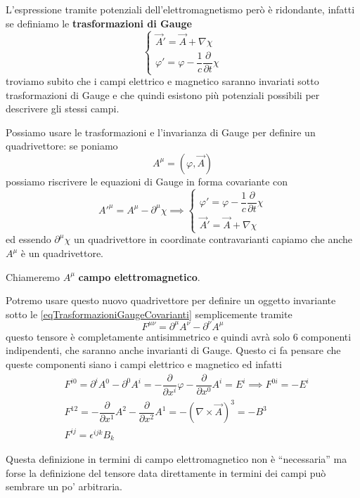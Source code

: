 \documentclass[12pt,a4paper,titlepage, twoside, openright]{book}
\numberwithin{equation}{chapter}
\begin{document}
L'espressione tramite potenziali dell'elettromagnetismo però è ridondante, infatti se definiamo le \textbf{trasformazioni di Gauge}
\begin{equation}
\begin{cases}
\vec{A}'=\vec{A} + \nabla\chi \\
\varphi '=\varphi -\dfrac{1}{c}\dfrac{\partial}{\partial t}\chi
\end{cases}
\end{equation}
troviamo subito che i campi elettrico e magnetico saranno invariati sotto trasformazioni di Gauge e che quindi esistono più potenziali possibili per descrivere gli stessi campi.

Possiamo usare le trasformazioni e l'invarianza di Gauge per definire un quadrivettore: se poniamo
\[
A^\mu=\left(\varphi,\vec{A}\right)
\]
possiamo riscrivere le equazioni di Gauge in forma covariante con
\begin{equation} \label{eqTrasformazioniGaugeCovarianti}
A'^\mu=A^\mu -\partial^\mu\chi \implies
\begin{cases}
\varphi '=\varphi -\dfrac{1}{c}\dfrac{\partial}{\partial t}\chi \\
\vec{A}'=\vec{A} + \nabla\chi
\end{cases}
\end{equation}
ed essendo $\partial^\mu\chi$ un quadrivettore in coordinate contravarianti capiamo che anche $A^\mu$ è un quadrivettore.

Chiameremo $A^\mu$ \textbf{campo elettromagnetico}.

Potremo usare questo nuovo quadrivettore per definire un oggetto invariante sotto le \ref{eqTrasformazioniGaugeCovarianti} semplicemente tramite
\[
F^{\mu\nu}=\partial^\mu A^\nu - \partial^\nu A^\mu
\]
questo tensore è completamente antisimmetrico e quindi avrà solo $6$ componenti indipendenti, che saranno anche invarianti di Gauge. Questo ci fa pensare che queste componenti siano i campi elettrico e magnetico ed infatti
\begin{align*}
& F^{i0}=\partial^i A^0 - \partial^0 A^i = -\dfrac{\partial}{\partial x^i}\varphi - \dfrac{\partial}{\partial x^0}A^i=E^i \implies F^{0i}=-E^i \\
& F^{12}=-\dfrac{\partial}{\partial x^1}A^2 -\dfrac{\partial}{\partial x^2}A^1 = -\left( \nabla\times\vec{A} \right)^3 =-B^3 \\
& F^{ij}=\epsilon^{ijk}B_k
\end{align*}

Questa definizione in termini di campo elettromagnetico non è ``necessaria'' ma forse la definizione del tensore data direttamente in termini dei campi può sembrare un po' arbitraria. 
\end{document}
